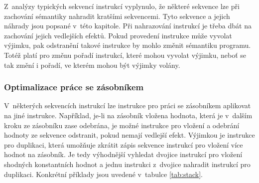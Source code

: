 Z~analýzy typických sekvencí instrukcí vyplynulo, že některé sekvence lze při zachování sémantiky nahradit kratšími sekvencemi.
Tyto sekvence a jejich náhrady jsou popsané v~této kapitole.
Při nahrazování instrukcí je třeba dbát na zachování jejich vedlejších efektů. Pokud provedení instrukce může vyvolat výjimku, pak odstranění takové instrukce by mohlo změnit sémantiku programu. Totéž platí pro změnu pořadí instrukcí, které mohou vyvolat výjimku, neboť se tak změní i pořadí, ve kterém mohou být výjimky volány.

\subsubsection{Optimalizace práce se zásobníkem}

V~některých sekvencích instrukcí lze instrukce pro práci se zásobníkem aplikovat na jiné instrukce. Například, je-li na zásobník vložena hodnota, která je v~dalším kroku ze zásobníku zase odebrána, je možné instrukce pro vložení a odebrání hodnoty ze sekvence odstranit, pokud nemají vedlejší efekt. Výjimkou je instrukce pro duplikaci, která umožňuje zkrátit zápis sekvence instrukcí pro vložení více hodnot na zásobník. Je tedy výhodnější vyhledat dvojice instrukcí pro vložení shodných konstantních hodnot a jednu instrukci z~dvojice nahradit instrukcí pro duplikaci. Konkrétní příklady jsou uvedené v~tabulce \ref{tab:stack}.


